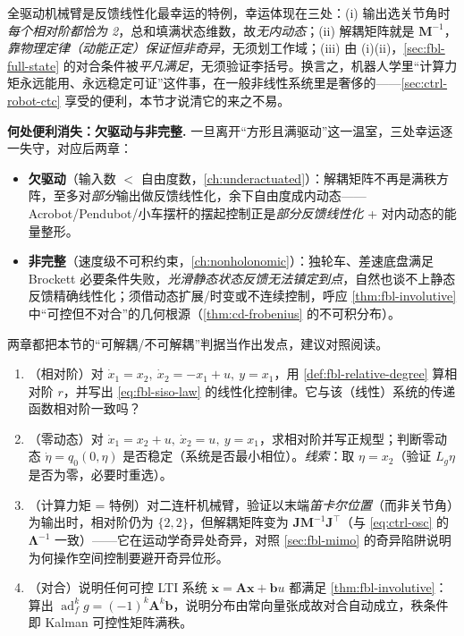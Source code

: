\begin{insight}
全驱动机械臂是反馈线性化最幸运的特例，幸运体现在三处：(i) 输出选关节角时\emph{每个相对阶都恰为 2}，总和填满状态维数，故\emph{无内动态}；(ii) 解耦矩阵就是 $\mathbf{M}^{-1}$，\emph{靠物理定律（动能正定）保证恒非奇异}，无须划工作域；(iii) 由 (i)(ii)，\cref{sec:fbl-full-state} 的对合条件被\emph{平凡满足}，无须验证李括号。换言之，机器人学里“计算力矩永远能用、永远稳定可证”这件事，在一般非线性系统里是奢侈的——\cref{sec:ctrl-robot-ctc} 享受的便利，本节才说清它的来之不易。
\end{insight}

\begin{note}
\textbf{何处便利消失：欠驱动与非完整.}\;
一旦离开“方形且满驱动”这一温室，三处幸运逐一失守，对应后两章：
\begin{itemize}
  \item \textbf{欠驱动}（输入数 $<$ 自由度数，\cref{ch:underactuated}）：解耦矩阵不再是满秩方阵，至多对\emph{部分}输出做反馈线性化，余下自由度成内动态——Acrobot/Pendubot/小车摆杆的摆起控制正是\emph{部分反馈线性化} + 对内动态的能量整形。
  \item \textbf{非完整}（速度级不可积约束，\cref{ch:nonholonomic}）：独轮车、差速底盘满足 Brockett 必要条件失败，\emph{光滑静态状态反馈无法镇定到点}，自然也谈不上静态反馈精确线性化；须借动态扩展/时变或不连续控制，呼应 \cref{thm:fbl-involutive} 中“可控但不对合”的几何根源（\cref{thm:cd-frobenius} 的不可积分布）。
\end{itemize}
两章都把本节的“可解耦/不可解耦”判据当作出发点，建议对照阅读。
\end{note}

\begin{practice}
\begin{enumerate}
  \item （相对阶）对 $\dot x_1=x_2,\ \dot x_2=-x_1+u,\ y=x_1$，用 \cref{def:fbl-relative-degree} 算相对阶 $r$，并写出 \cref{eq:fbl-siso-law} 的线性化控制律。它与该（线性）系统的传递函数相对阶一致吗？
  \item （零动态）对 $\dot x_1=x_2+u,\ \dot x_2=u,\ y=x_1$，求相对阶并写正规型；判断零动态 $\dot\eta=q_0(0,\eta)$ 是否稳定（系统是否最小相位）。\emph{线索}：取 $\eta=x_2$（验证 $L_g\eta$ 是否为零，必要时重选）。
  \item （计算力矩 = 特例）对二连杆机械臂，验证以末端\emph{笛卡尔位置}（而非关节角）为输出时，相对阶仍为 $\{2,2\}$，但解耦矩阵变为 $\mathbf{J}\mathbf{M}^{-1}\mathbf{J}^\top$（与 \cref{eq:ctrl-osc} 的 $\boldsymbol{\Lambda}^{-1}$ 一致）——它在运动学奇异处奇异，对照 \cref{sec:fbl-mimo} 的奇异陷阱说明为何操作空间控制要避开奇异位形。
  \item （对合）说明任何可控 LTI 系统 $\dot{\mathbf{x}}=\mathbf{A}\mathbf{x}+\mathbf{b}u$ 都满足 \cref{thm:fbl-involutive}：算出 $\operatorname{ad}_f^k g=(-1)^k\mathbf{A}^k\mathbf{b}$，说明分布由常向量张成故对合自动成立，秩条件即 Kalman 可控性矩阵满秩。
\end{enumerate}
\end{practice}

